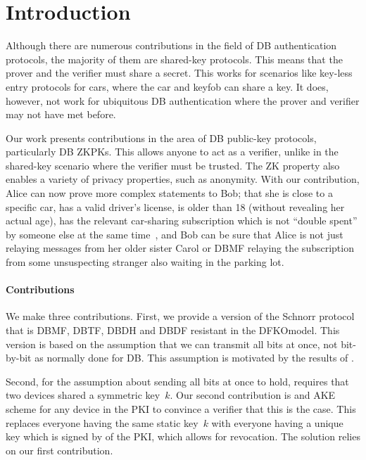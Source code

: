 \section{Introduction}%
\label{Introduction}

Although there are numerous contributions in the field of \ac{DB} 
authentication protocols, the majority of them are shared-key protocols.
This means that the prover and the verifier must share a secret.
This works for scenarios like key-less entry protocols for cars, where the car and keyfob 
can share a key.
It does, however, not work for ubiquitous \ac{DB} authentication where
the prover and verifier may not have met before.

Our work presents contributions in the area of \ac{DB} public-key protocols, 
particularly \ac{DB} \acp{ZKPK}.
This allows anyone to act as a verifier, unlike in the shared-key scenario 
where the verifier must be trusted.
The \ac{ZK} property also enables a variety of privacy properties, such as 
anonymity.
With our contribution, Alice can
now prove more complex statements to Bob; \eg that she is close to a specific car, has a valid driver's license, is older than 18 
(without revealing her actual age), has the relevant car-sharing subscription which is not 
\enquote{double spent} by someone else at the same time~\cite[\eg][]{AnonPass}, 
and  Bob can be sure that Alice is not just relaying messages 
from her older sister Carol or \ac{DBMF} relaying the subscription from some 
unsuspecting stranger also waiting in the parking lot.



\paragraph*{Contributions}

We make three contributions.
First, we provide a version of the Schnorr protocol that is \ac{DBMF}, 
\ac{DBTF}, \ac{DBDH} and \ac{DBDF} resistant in the \ac{DFKOmodel}.
This version is based on the assumption that we can transmit all bits at once, 
not bit-by-bit as normally done for \ac{DB}.
This assumption is motivated by the results of \textcite{UWBPR}.

Second, for the assumption about sending all bits at once to hold, 
\textcite{UWBPR} requires that two devices shared a symmetric key~\(k\).
Our second contribution is  and \ac{AKE} scheme for any device in 
the \ac{PKI} to convince a verifier that this is the case.
This replaces everyone having the same static key~\(k\) with everyone having a 
unique key which is signed by  of the \ac{PKI}, which allows for 
revocation.
The solution relies on our first contribution.

